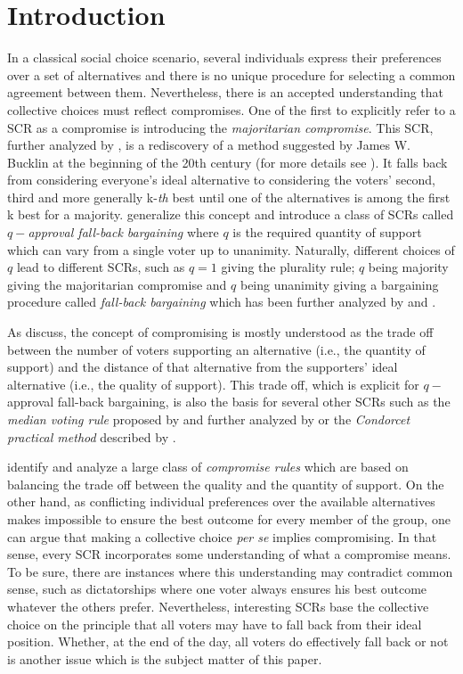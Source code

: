 \documentclass[version=3.21, pagesize, twoside=off, bibliography=totoc, DIV=calc, fontsize=12pt, a4paper]{scrartcl}
\begin{document}
\section{Introduction}
\label{sec:introduction}
In a classical social choice scenario, several individuals express their preferences over a set of alternatives and there is no unique procedure for selecting a common agreement between them. Nevertheless, there is an accepted understanding that collective choices must reflect compromises. One of the first to explicitly refer to a \ac{SCR} as a compromise is \citet{Sertel1986} introducing the \textit{majoritarian compromise}. This \ac{SCR}, further analyzed by \citet{Sertel1999}, is a rediscovery of a method suggested by James W. Bucklin at the beginning of the 20th century (for more details see \citet{Erdelyi2015}). It falls back from considering everyone’s ideal alternative to considering the voters’ second, third and more generally k-\emph{th} best until one of the alternatives is among the first k best for a majority. \citet{Brams2001} generalize this concept and introduce a class of \acp{SCR} called $q-$\textit{approval fall-back bargaining }where $q$ is the required quantity of support which can vary from a single voter up to unanimity. Naturally, different choices of $q$ lead to different \acp{SCR}, such as $q=1$ giving the plurality rule; $q$ being majority giving the majoritarian compromise and $q$ being unanimity giving a bargaining procedure called \textit{fall-back bargaining} which has been further analyzed by \citet{Kibris2007} and \citet{Congar2012}. 

As \citet{OezkalSanver2004} discuss, the concept of compromising is mostly understood as the trade off between the number of voters supporting an alternative (i.e., the quantity of support) and the distance of that alternative from the supporters' ideal alternative (i.e., the quality of support). This trade off, which is explicit for $q-$approval fall-back bargaining, is also the basis for several other \acp{SCR} such as the \textit{median voting rule} proposed by \citet{Bassett1999} and further analyzed by \citet{Gehrlein2003} or the \textit{Condorcet practical method }described by \citet{Nurmi1999}.

\citet{Merlin2019} identify and analyze a large class of \textit{compromise rules} which are based on balancing the trade off between the quality and the quantity of support. On the other hand, as conflicting
individual preferences over the available alternatives makes impossible to ensure the best outcome for every member of the group, one can argue that making a collective choice \textit{per se} implies compromising. In that sense, every \ac{SCR} incorporates some understanding of what a compromise means. To be sure, there are instances where this understanding may contradict common sense, such as dictatorships where one voter always ensures his best outcome whatever the others prefer. Nevertheless, interesting \acp{SCR} base the collective choice on the principle that all voters may have to fall back from their ideal position. Whether, at the end of the day, all voters do effectively fall back or not is another issue which is the subject matter of this paper.
\end{document}
